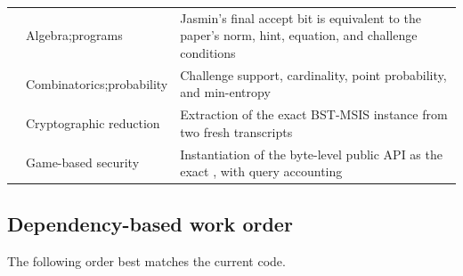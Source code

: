 \begin{longtable}{L{0.28\textwidth}L{0.18\textwidth}L{0.46\textwidth}}
 & Algebra;\newline programs & Jasmin's final accept bit is equivalent
to the paper's norm, hint, equation, and challenge conditions \\
 & Combinatorics;\newline probability & Challenge support,
cardinality, point probability, and min-entropy \\
 & Cryptographic reduction & Extraction of the exact
BST-MSIS instance from two fresh transcripts \\
 & Game-based security & Instantiation of the byte-level
public API as the exact , with query accounting \\
\bottomrule
\end{longtable}

\subsection{Dependency-based work order}

The following order best matches the current code.


